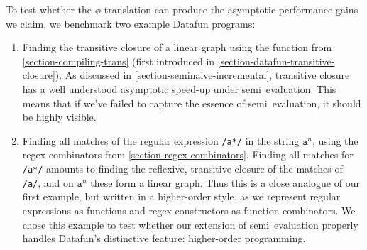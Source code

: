 


To test whether the $\phi$ translation can produce the asymptotic performance
gains we claim, we benchmark two example Datafun programs:

\begin{enumerate}
\item Finding the transitive closure of a linear graph using the 
  function from \cref{section-compiling-trans} (first introduced in
  \cref{section-datafun-transitive-closure}). As discussed in
  \cref{section-seminaive-incremental}, transitive closure has a well understood
  asymptotic speed-up under semi\naive\ evaluation. This means that if we've
  failed to capture the essence of semi\naive\ evaluation, it should be highly
  visible.

\item Finding all matches of the regular expression \texttt{/a*/} in the string
  $\texttt{a}^n$, using the regex combinators from
  \cref{section-regex-combinators}. Finding all matches for \texttt{/a*/}
  amounts to finding the reflexive, transitive closure of the matches of
  \texttt{/a/}, and on $\texttt{a}^n$ these form a linear graph.
%
  Thus this is a close analogue of our first example, but written in a
  higher-order style, as we represent regular expressions as functions and
  regex constructors as function combinators.
%
  We chose this example to test whether our extension of semi\naive\ evaluation
  properly handles Datafun's distinctive feature: higher-order programming.
\end{enumerate}




